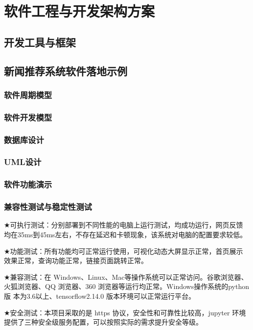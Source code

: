 \documentclass[withoutpreface,bwprint]{cumcmthesis} %
\begin{document}
	\section{软件工程与开发架构方案}
	\subsection{开发工具与框架}
	\subsection{新闻推荐系统软件落地示例}
	\subsubsection{ 软件周期模型}
	\subsubsection{ 软件开发模型}
	\subsubsection{ 数据库设计}
	\subsubsection{ UML设计}
	\subsubsection{ 软件功能演示}
	\subsubsection{ 兼容性测试与稳定性测试}
	$\bigstar$可执行测试：分别部署到不同性能的电脑上运行测试，均成功运行，网页反馈
	均在35ms到45ms左右，不存在延迟和卡顿现象，该系统对电脑的配置要求较低。\par
	$\bigstar$功能测试：所有功能均可正常运行使用，可视化动态大屏显示正常，首页展示
	效果正常，查询功能正常，链接页面跳转正常。\par
	$\bigstar$兼容测试：在 Windows、Linux、Mac等操作系统可以正常访问。谷歌浏览器、
	火狐浏览器、QQ 浏览器、360 浏览器等运行均正常。Windows操作系统的python版
	本为3.6以上、tensorflow2.14.0 版本环境可以正常运行平台。\par
	$\bigstar$安全测试：本项目采取的是 https 协议，安全性和可靠性比较高，jupyter 环境
	提供了三种安全级服务配置，可以按照实际的需求提升安全等级。\par
\end{document}

